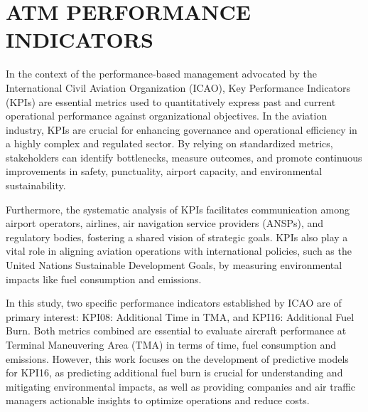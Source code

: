 \section{ATM PERFORMANCE INDICATORS}
\label{sec:atm_indicators}

In the context of the performance-based management advocated by the International Civil Aviation Organization (ICAO), Key Performance Indicators (KPIs) are essential metrics used to quantitatively express past and current operational performance against organizational objectives. In the aviation industry, KPIs are crucial for enhancing governance and operational efficiency in a highly complex and regulated sector. By relying on standardized metrics, stakeholders can identify bottlenecks, measure outcomes, and promote continuous improvements in safety, punctuality, airport capacity, and environmental sustainability. 

Furthermore, the systematic analysis of KPIs facilitates communication among airport operators, airlines, air navigation service providers (ANSPs), and regulatory bodies, fostering a shared vision of strategic goals. KPIs also play a vital role in aligning aviation operations with international policies, such as the United Nations Sustainable Development Goals, by measuring environmental impacts like fuel consumption and emissions.

In this study, two specific performance indicators established by ICAO are of primary interest: KPI08: Additional Time in TMA, and KPI16: Additional Fuel Burn. Both metrics combined are essential to evaluate aircraft performance at Terminal Maneuvering Area (TMA) in terms of time, fuel consumption and emissions. However, this work focuses on the development of predictive models for KPI16, as predicting additional fuel burn is crucial for understanding and mitigating environmental impacts, as well as providing companies and air traffic managers actionable insights to optimize operations and reduce costs.

